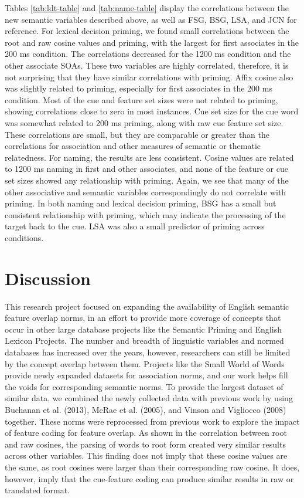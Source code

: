 \documentclass[english,man]{apa6}
\theoremstyle{definition}
\theoremstyle{definition}
\theoremstyle{definition}
\theoremstyle{remark}
\begin{document}
Tables \ref{tab:ldt-table} and \ref{tab:name-table} display the
correlations between the new semantic variables described above, as well
as FSG, BSG, LSA, and JCN for reference. For lexical decision priming,
we found small correlations between the root and raw cosine values and
priming, with the largest for first associates in the 200 ms condition.
The correlations decreased for the 1200 ms condition and the other
associate SOAs. These two variables are highly correlated, therefore, it
is not surprising that they have similar correlations with priming.
Affix cosine also was slightly related to priming, especially for first
associates in the 200 ms condition. Most of the cue and feature set
sizes were not related to priming, showing correlations close to zero in
most instances. Cue set size for the cue word was somewhat related to
200 ms priming, along with raw cue feature set size. These correlations
are small, but they are comparable or greater than the correlations for
association and other measures of semantic or thematic relatedness. For
naming, the results are less consistent. Cosine values are related to
1200 ms naming in first and other associates, and none of the feature or
cue set sizes showed any relationship with priming. Again, we see that
many of the other associative and semantic variables correspondingly do
not correlate with priming. In both naming and lexical decision priming,
BSG has a small but consistent relationship with priming, which may
indicate the processing of the target back to the cue. LSA was also a
small predictor of priming across conditions.

\section{Discussion}\label{discussion}

This research project focused on expanding the availability of English
semantic feature overlap norms, in an effort to provide more coverage of
concepts that occur in other large database projects like the Semantic
Priming and English Lexicon Projects. The number and breadth of
linguistic variables and normed databases has increased over the years,
however, researchers can still be limited by the concept overlap between
them. Projects like the Small World of Words provide newly expanded
datasets for association norms, and our work helps fill the voids for
corresponding semantic norms. To provide the largest dataset of similar
data, we combined the newly collected data with previous work by using
Buchanan et al. (2013), McRae et al. (2005), and Vinson and Vigliocco
(2008) together. These norms were reprocessed from previous work to
explore the impact of feature coding for feature overlap. As shown in
the correlation between root and raw cosines, the parsing of words to
root form created very similar results across other variables. This
finding does not imply that these cosine values are the same, as root
cosines were larger than their corresponding raw cosine. It does,
however, imply that the cue-feature coding can produce similar results
in raw or translated format.
\end{document}
